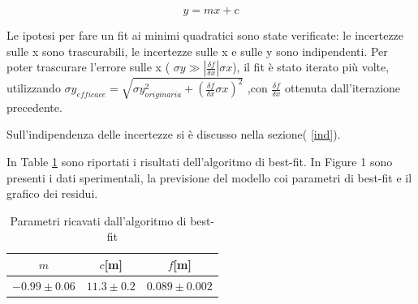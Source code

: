 \documentclass{article}
\begin{document}
\begin{equation}
	y=mx+c
	\label{fiteq}
\end{equation}

Le ipotesi per fare un fit ai minimi quadratici sono state verificate: le incertezze sulle x sono trascurabili, le incertezze sulle x e sulle y sono indipendenti.
Per poter trascurare l'errore sulle x ( $\sigma y \gg  \left| \frac{\delta f}{\delta x} \right| \sigma x $),  il fit è stato iterato più volte, 
utilizzando $\sigma y_{efficace}=\sqrt{\sigma y_{originaria}^2+(\frac{\delta f}{\delta x} \sigma x)^2}$ ,con $\frac{\delta f}{\delta x} $ ottenuta dall'iterazione precedente.


Sull'indipendenza delle incertezze si è discusso nella sezione( \ref{ind}).

In Table \ref{Pacciani} sono riportati i risultati dell'algoritmo di best-fit.
In Figure 1 sono presenti i dati sperimentali, la previsione del modello coi parametri di best-fit e il grafico dei residui.

		\begin{table}
			\centering
				\begin{tabular}{|c|c|c|}

					\hline
						$m$  & $c$[m] & $f$[m]\\
					\hline
			
						$-0.99\pm0.06$ & $11.3\pm0.2$ & $0.089\pm0.002$\\
					\hline
			
				\end{tabular}
					\caption{ Parametri ricavati dall'algoritmo di best-fit}
			\label{Pacciani}
		\end{table}		
\end{document}
